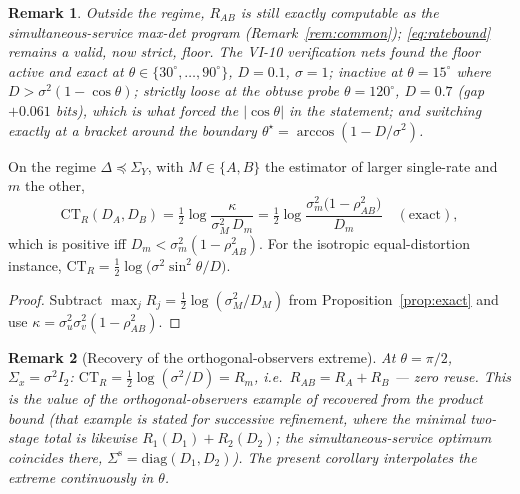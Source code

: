 \documentclass[11pt]{article}
\newtheorem{remark}{Remark}\newtheorem{definition}{Definition}
\begin{document}
\begin{remark}
Outside the regime, $R_{AB}$ is still exactly computable as the
simultaneous-service max-det program (Remark~\ref{rem:common});
\eqref{eq:ratebound} remains a valid, now strict, floor. The VI-10
verification nets found the floor active and exact at
$\theta\in\{30^\circ,\dots,90^\circ\}$, $D=0.1$, $\sigma=1$; inactive at
$\theta=15^\circ$ where $D>\sigma^2(1-\cos\theta)$; strictly loose at the
obtuse probe $\theta=120^\circ$, $D=0.7$ (gap $+0.061$ bits), which is what
forced the $\lvert\cos\theta\rvert$ in the statement; and switching exactly
at a bracket around the boundary $\theta^\star=\arccos(1-D/\sigma^2)$.
\end{remark}

\begin{corollary}\label{cor:taxrate}
On the regime $\Delta\preceq\Sigma_Y$, with $M\in\{A,B\}$ the estimator of
larger single-rate and $m$ the other,
\[
\mathrm{CT}_R(D_A,D_B)
=\tfrac12\log\frac{\kappa}{\sigma_M^2\,D_m}
=\tfrac12\log\frac{\sigma_m^2\bigl(1-\rho_{AB}^2\bigr)}{D_m}
\quad(\text{exact}),
\]
which is positive iff $D_m<\sigma_m^2(1-\rho_{AB}^2)$. For the isotropic
equal-distortion instance,
$\mathrm{CT}_R=\tfrac12\log\bigl(\sigma^2\sin^2\theta/D\bigr)$.
\end{corollary}
\begin{proof}
Subtract $\max_j R_j=\tfrac12\log(\sigma_M^2/D_M)$ from
Proposition~\ref{prop:exact} and use
$\kappa=\sigma_u^2\sigma_v^2(1-\rho_{AB}^2)$.
\end{proof}

\begin{remark}[Recovery of the orthogonal-observers extreme]
At $\theta=\pi/2$, $\Sigma_x=\sigma^2I_2$:
$\mathrm{CT}_R=\tfrac12\log(\sigma^2/D)=R_m$, i.e.\
$R_{AB}=R_A+R_B$ --- zero reuse. This is the \emph{value} of the
orthogonal-observers example of \cite[\S6]{bondtwoobserver} recovered from
the product bound (that example is stated for successive refinement, where
the minimal two-stage total is likewise $R_1(D_1)+R_2(D_2)$; the
simultaneous-service optimum coincides there, $\Sigma^{\mathrm s}=
\mathrm{diag}(D_1,D_2)$). The present corollary interpolates the extreme
continuously in $\theta$.
\end{remark}
\end{document}
